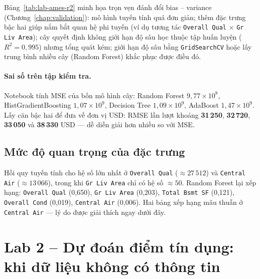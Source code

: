 Bảng~\ref{tab:lab-ames-r2} minh họa trọn vẹn đánh đổi bias -- variance (Chương~\ref{chap:validation}): mô hình tuyến tính quá đơn giản; thêm đặc trưng bậc hai giúp nắm bắt quan hệ phi tuyến (ví dụ tương tác \texttt{Overall Qual} $\times$ \texttt{Gr Liv Area}); cây quyết định không giới hạn độ sâu học thuộc tập huấn luyện ($R^2 = 0{,}995$) nhưng tổng quát kém; giới hạn độ sâu bằng \texttt{GridSearchCV} hoặc lấy trung bình nhiều cây (Random Forest) khắc phục được điều đó.

\paragraph{Sai số trên tập kiểm tra.} Notebook tính MSE của bốn mô hình cây: Random Forest $9{,}77 \times 10^8$, HistGradientBoosting $1{,}07 \times 10^9$, Decision Tree $1{,}09 \times 10^9$, AdaBoost $1{,}47 \times 10^9$. Lấy căn bậc hai để đưa về đơn vị USD: RMSE lần lượt khoảng \textbf{31\,250}, \textbf{32\,720}, \textbf{33\,050} và \textbf{38\,330} USD --- dễ diễn giải hơn nhiều so với MSE.

\subsection{Mức độ quan trọng của đặc trưng}



Hồi quy tuyến tính cho hệ số lớn nhất ở \texttt{Overall Qual} ($\approx 27\,512$) và \texttt{Central Air} ($\approx 13\,066$), trong khi \texttt{Gr Liv Area} chỉ có hệ số $\approx 50$. Random Forest lại xếp hạng: \texttt{Overall Qual} (0,650), \texttt{Gr Liv Area} (0,203), \texttt{Total Bsmt SF} (0,121), \texttt{Overall Cond} (0,019), \texttt{Central Air} (0,006). Hai bảng xếp hạng mâu thuẫn ở \texttt{Central Air} --- lý do được giải thích ngay dưới đây.

\section{Lab 2 -- Dự đoán điểm tín dụng: khi dữ liệu không có thông tin}
\label{sec:lab-bank}

